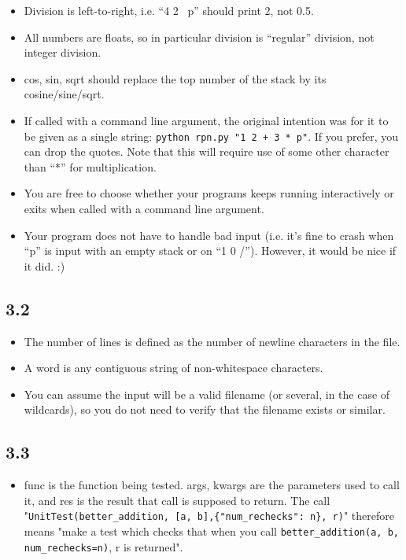 \documentclass[english]{article}
\begin{document}
\begin{itemize}
\item Division is left-to-right, i.e. ``4 2 \ p'' should print 2, not 0.5.
\item All numbers are floats, so in particular division is ``regular'' division, not integer division.
\item cos, sin, sqrt should replace the top number of the stack by its cosine/sine/sqrt.
\item If called with a command line argument, the original intention was for it to be given as a single string: \texttt{python rpn.py "1 2 + 3 * p"}. If you prefer, you can drop the quotes. Note that this will require use of some other character than ``*'' for multiplication.
\item You are free to choose whether your programs keeps running interactively or exits when called with a command line argument.
\item Your program does not have to handle bad input (i.e. it's fine to crash when ``p'' is input with an empty stack or on ``1 0 /''). However, it would be nice if it did. :) 
\end{itemize}

\subsection{3.2}
\begin{itemize}
\item The number of lines is defined as the number of newline characters in the file. 
\item A word is any contiguous string of non-whitespace characters. 
\item You can assume the input will be a valid filename (or several, in the case of wildcards), so you do not need to verify that the filename exists or similar.
\end{itemize}

\subsection{3.3}
\begin{itemize}
\item func is the function being tested. args, kwargs are the parameters used to call it, and res is the result that call is supposed to return. The call "\texttt{UnitTest(better\_addition, [a, b],\{"num\_rechecks": n\}, r)}" therefore means "make a test which checks
  that when you call \texttt{better\_addition(a, b, num\_rechecks=n)}, r is
  returned".
\end{itemize}
\end{document}
